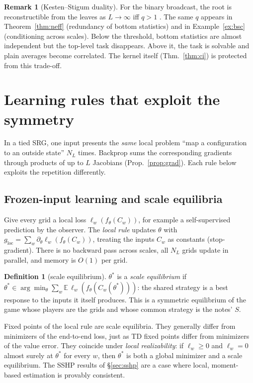 \documentclass[11pt]{article}
\theoremstyle{definition}
\newtheorem{definition}[theorem]{Definition}
\newtheorem{remark}[theorem]{Remark}
\newcommand{\E}{\mathbb{E}}
\newcommand{\Nint}{N_{L}}
\begin{document}
\begin{remark}[Kesten--Stigum duality]
For the binary broadcast, the root is reconstructible from the leaves as $L\to\infty$ iff $q>1$
\cite{kesten1966,evans2000,mossel2004}. The same $q$ appears in Theorem~\ref{thm:neff}
(redundancy of bottom statistics) and in Example~\ref{ex:bsc} (conditioning across scales).
Below the threshold, bottom statistics are almost independent but the top-level task
disappears. Above it, the task is solvable and plain averages become correlated. The kernel
itself (Thm.~\ref{thm:ci}) is protected from this trade-off.
\end{remark}

\section{Learning rules that exploit the symmetry}\label{sec:rules}
In a tied SRG, one input presents the \emph{same} local problem ``map a configuration to an
outside state'' $\Nint$ times. Backprop sums the corresponding gradients through products of up
to $L$ Jacobians (Prop.~\ref{prop:grad}). Each rule below exploits the repetition differently.

\subsection{Frozen-input learning and scale equilibria}
Give every grid a local loss $\ell_w(f_\theta(C_w))$, for example a self-supervised prediction by
the observer. The \emph{local rule} updates $\theta$ with
$g_{\mathrm{loc}}=\sum_w\partial_\theta\ell_w(f_\theta(C_w))$, treating the inputs $C_w$ as
constants (stop-gradient). There is no backward pass across scales, all $\Nint$ grids update in
parallel, and memory is $O(1)$ per grid.

\begin{definition}[scale equilibrium]
$\theta^*$ is a \emph{scale equilibrium} if
$\theta^*\in\arg\min_\theta\sum_w\E\,\ell_w(f_\theta(C_w(\theta^*)))$: the shared strategy is a
best response to the inputs it itself produces. This is a symmetric equilibrium of the game whose
players are the grids and whose common strategy is the notes' $S$.
\end{definition}
Fixed points of the local rule are scale equilibria. They generally differ from minimizers of the
end-to-end loss, just as TD fixed points differ from minimizers of the value error. They
coincide under \emph{local realizability}: if $\ell_w\ge0$ and $\ell_w=0$ almost surely at
$\theta^*$ for every $w$, then $\theta^*$ is both a global minimizer and a scale equilibrium.
The SSHP results of \S\ref{sec:sshp} are a case where local, moment-based estimation is provably
consistent.
\end{document}

